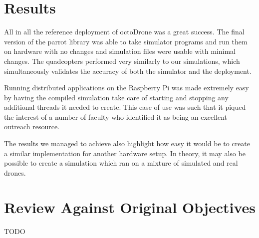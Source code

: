 \section{Results}
All in all the reference deployment of octoDrone was a great success. The final version of the parrot library was able to take simulator programs and run them on hardware with no changes and simulation files were usable with minimal changes. The quadcopters performed very similarly to our simulations, which simultaneously validates the accuracy of both the simulator and the deployment.

Running distributed applications on the Raspberry Pi was made extremely easy by having the compiled simulation take care of starting and stopping any additional threads it needed to create. This ease of use was such that it piqued the interest of a number of faculty who identified it as being an excellent outreach resource.

The results we managed to achieve also highlight how easy it would be to create a similar implementation for another hardware setup. In theory, it may also be possible to create a simulation which ran on a mixture of simulated and real drones. 

\section{Review Against Original Objectives}
TODO
